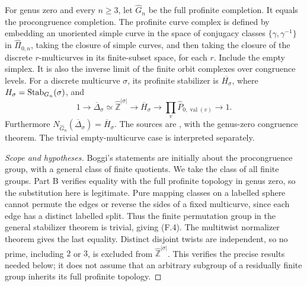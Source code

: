 For genus zero and every $n\geq3$, let $\widehat G_n$ be the full profinite completion. It equals the procongruence completion. The profinite curve complex is defined by embedding an unoriented simple curve in the space of conjugacy classes $\{\gamma,\gamma^{-1}\}$ in $\widehat\Pi_{0,n}$, taking the closure of simple curves, and then taking the closure of the discrete $r$-multicurves in its finite-subset space, for each $r$. Include the empty simplex. It is also the inverse limit of the finite orbit complexes over congruence levels. For a discrete multicurve $\sigma$, its profinite stabilizer is $\overline{H_\sigma}$, where $H_\sigma=\operatorname{Stab}_{G_n}(\sigma)$, and
\[
1\longrightarrow\overline\Delta_\sigma\simeq\widehat{\mathbb Z}^{|\sigma|}
 \longrightarrow\overline H_\sigma
 \longrightarrow\prod_v\widehat P_{0,\operatorname{val}(v)}\longrightarrow1. \tag{F.4}
\]
Furthermore $N_{\widehat G_n}(\overline\Delta_\sigma)=\overline H_\sigma$.
The sources are \citet[Definitions 3.3--3.4, Theorems 3.5--3.6, Theorem 4.2, and Corollary 4.3]{Boggi2020BC}, with the genus-zero congruence theorem. The trivial empty-multicurve case is interpreted separately.
\begin{proof}[Scope and hypotheses]
Boggi's statements are initially about the procongruence group, with a general class of finite quotients. We take the class of all finite groups. Part B verifies equality with the full profinite topology in genus zero, so the substitution here is legitimate. Pure mapping classes on a labelled sphere cannot permute the edges or reverse the sides of a fixed multicurve, since each edge has a distinct labelled split. Thus the finite permutation group in the general stabilizer theorem is trivial, giving (F.4). The multitwist normalizer theorem gives the last equality. Distinct disjoint twists are independent, so no prime, including $2$ or $3$, is excluded from $\widehat{\mathbb Z}^{|\sigma|}$. This verifies the precise results needed below; it does not assume that an arbitrary subgroup of a residually finite group inherits its full profinite topology.
\end{proof}

